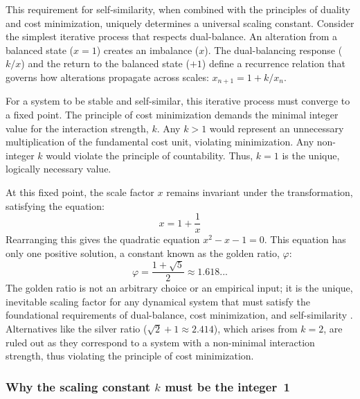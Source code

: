 This requirement for self-similarity, when combined with the principles of duality and cost minimization, uniquely determines a universal scaling constant. Consider the simplest iterative process that respects dual-balance. An alteration from a balanced state (\(x=1\)) creates an imbalance (\(x\)). The dual-balancing response (\(k/x\)) and the return to the balanced state (\(+1\)) define a recurrence relation that governs how alterations propagate across scales: \(x_{n+1} = 1 + k/x_n\).

For a system to be stable and self-similar, this iterative process must converge to a fixed point. The principle of cost minimization demands the minimal integer value for the interaction strength, \(k\). Any \(k>1\) would represent an unnecessary multiplication of the fundamental cost unit, violating minimization. Any non-integer \(k\) would violate the principle of countability. Thus, \(k=1\) is the unique, logically necessary value.

At this fixed point, the scale factor \(x\) remains invariant under the transformation, satisfying the equation:
\begin{equation}
x = 1 + \frac{1}{x}
\end{equation}
Rearranging this gives the quadratic equation \(x^2 - x - 1 = 0\). This equation has only one positive solution, a constant known as the golden ratio, \(\varphi\):
\begin{equation}
\varphi = \frac{1 + \sqrt{5}}{2} \approx 1.618...
\end{equation}
The golden ratio is not an arbitrary choice or an empirical input; it is the unique, inevitable scaling factor for any dynamical system that must satisfy the foundational requirements of dual-balance, cost minimization, and self-similarity \cite{Livio2002}. Alternatives like the silver ratio (\(\sqrt{2}+1 \approx 2.414\)), which arises from \(k=2\), are ruled out as they correspond to a system with a non-minimal interaction strength, thus violating the principle of cost minimization.

\subsubsection*{Why the scaling constant \texorpdfstring{$k$}{k} must be the integer 1}


